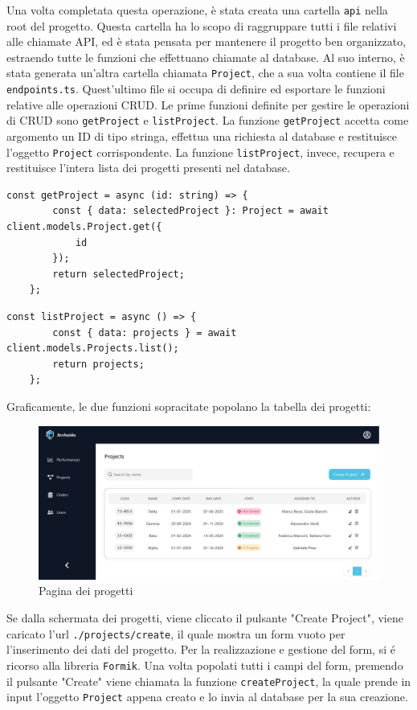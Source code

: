 \documentclass[target=bach,aauheader=,style=]{thud}
\begin{document}
Una volta completata questa operazione, è stata creata una cartella \texttt{api} nella root del progetto. Questa cartella ha lo scopo di raggruppare tutti i file relativi alle chiamate API, ed è stata pensata per mantenere il progetto ben organizzato, estraendo tutte le funzioni che effettuano chiamate al database. Al suo interno, è stata generata un'altra cartella chiamata \texttt{Project}, che a sua volta contiene il file \texttt{endpoints.ts}. Quest'ultimo file si occupa di definire ed esportare le funzioni relative alle operazioni CRUD. 
Le prime funzioni definite per gestire le operazioni di CRUD sono \texttt{getProject} e \texttt{listProject}. La funzione \texttt{getProject} accetta come argomento un ID di tipo stringa, effettua una richiesta al database e restituisce l'oggetto \texttt{Project} corrispondente. La funzione \texttt{listProject}, invece, recupera e restituisce l'intera lista dei progetti presenti nel database.

\begin{lstlisting}[caption=funzione \texttt{getProject}]
    const getProject = async (id: string) => {
        const { data: selectedProject }: Project = await client.models.Project.get({
            id
        });
        return selectedProject;
    };
\end{lstlisting}
\begin{lstlisting}[caption=funzione \texttt{listProject}]
    const listProject = async () => {
        const { data: projects } = await client.models.Projects.list();
        return projects;
    };
\end{lstlisting}
Graficamente, le due funzioni sopracitate popolano la tabella dei progetti:

\begin{figure}[htbp]
    \centering
    \includegraphics[width=1\textwidth]{img/interfacce/table_project.pdf} 
    \caption{Pagina dei progetti}
\end{figure}
Se dalla schermata dei progetti, viene cliccato il pulsante "Create Project", viene caricato l'url \texttt{./projects/create}, il quale mostra un form vuoto per l'inserimento dei dati del progetto. Per la realizzazione e gestione del form, si é ricorso alla libreria \texttt{Formik}. Una volta popolati tutti i campi del form, premendo il pulsante "Create" viene chiamata la funzione \texttt{createProject}, la quale prende in input l'oggetto \texttt{Project} appena creato e lo invia al database per la sua creazione.
\end{document}
